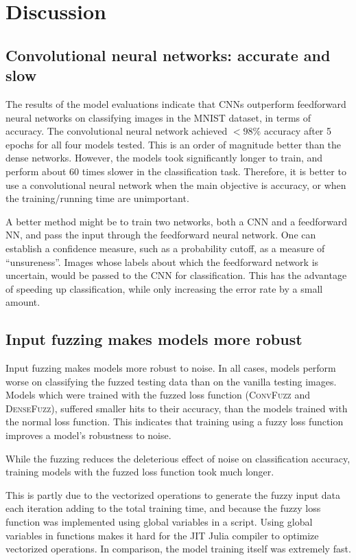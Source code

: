 \documentclass{article}
\begin{document}
\section{Discussion}

\subsection{Convolutional neural networks: accurate and slow}

The results of the model evaluations indicate that CNNs outperform feedforward neural networks
on classifying images in the MNIST dataset, in terms of accuracy.
The convolutional neural network achieved $< 98\%$ accuracy after 5 epochs
for all four models tested.
This is an order of magnitude better than the dense networks.
However, the models took significantly longer to train, and perform about 60 times slower
in the classification task.
Therefore, it is better to use a convolutional neural network
when the main objective is accuracy, or when the training/running time are unimportant.

A better method might be to train two networks, both a CNN and a feedforward NN,
and pass the input through the feedforward neural network.
One can establish a confidence measure, such as a probability cutoff,
as a measure of ``unsureness''.
Images whose labels about which the feedforward network is uncertain,
would be passed to the CNN for classification.
This has the advantage of speeding up classification,
while only increasing the error rate by a small amount.

\subsection{Input fuzzing makes models more robust}

Input fuzzing makes models more robust to noise.
In all cases, models perform worse on classifying the fuzzed testing data
than on the vanilla testing images.
Models which were trained with the fuzzed loss function (\textsc{ConvFuzz} and \textsc{DenseFuzz}),
suffered smaller hits to their accuracy, than the models trained with the normal loss function.
This indicates that training using a fuzzy loss function improves a model's robustness to noise.

While the fuzzing reduces the deleterious effect of noise on classification accuracy,
training models with the fuzzed loss function took much longer.

This is partly due to the vectorized operations to generate the fuzzy input data each iteration
adding to the total training time,
and because the fuzzy loss function was implemented using global variables in a script.
Using global variables in functions makes it hard for the JIT Julia compiler to optimize vectorized operations.
In comparison, the model training itself was extremely fast.
\end{document}
